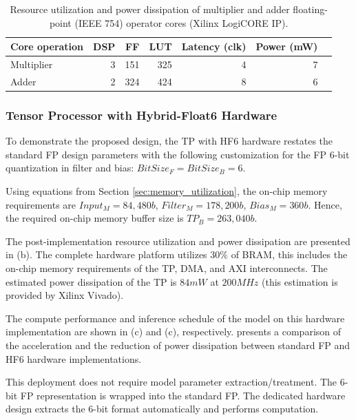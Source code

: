 \begin{table}[!h]\centering
	\caption{Resource utilization and power dissipation of multiplier and adder floating-point (IEEE 754) operator cores (Xilinx LogiCORE IP).}\label{tab:LogiCORE}
	\scriptsize
	\begin{tabular}{lrrrrrr}\toprule
		\textbf{Core operation} &\textbf{DSP} &\textbf{FF} &\textbf{LUT} &\textbf{Latency (clk)} &\textbf{Power (mW)} \\\midrule
		Multiplier &3 &151 &325 &4 &7 \\
		Adder &2 &324 &424 &8 &6 \\
		\bottomrule
	\end{tabular}
\end{table}



\subsubsection{Tensor Processor with Hybrid-Float6 Hardware}
To demonstrate the proposed design, the TP with HF6 hardware restates the standard FP design parameters with the following customization for the FP 6-bit quantization in filter and bias: $BitSize_F=BitSize_B=6$.

Using equations from Section \ref{sec:memory_utilization}, the on-chip memory requirements are $Input_M=84,480b$, $Filter_M=178,200b$, $Bias_M=360b$. Hence, the required on-chip memory buffer size is $TP_B=263,040b$.

The post-implementation resource utilization and power dissipation are presented in (b). The complete hardware platform utilizes 30\% of BRAM, this includes the on-chip memory requirements of the TP, DMA, and AXI interconnects. The estimated power dissipation of the TP is $84mW$ at $200MHz$ (this estimation is provided by Xilinx Vivado).

The compute performance and inference schedule of the model on this hardware implementation are shown in (c) and (c), respectively.  presents a comparison of the acceleration and the reduction of power dissipation between standard FP and HF6 hardware implementations.

This deployment does not require model parameter extraction/treatment. The 6-bit FP representation is wrapped into the standard FP. The dedicated hardware design extracts the 6-bit format automatically and performs computation.

